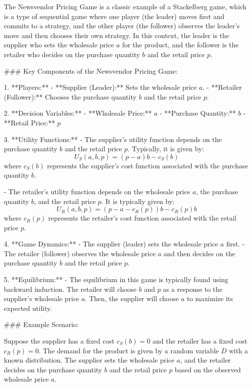 The Newsvendor Pricing Game is a classic example of a Stackelberg game, which is a type of sequential game where one player (the leader) moves first and commits to a strategy, and the other player (the follower) observes the leader's move and then chooses their own strategy. In this context, the leader is the supplier who sets the wholesale price \(a\) for the product, and the follower is the retailer who decides on the purchase quantity \(b\) and the retail price \(p\).

### Key Components of the Newsvendor Pricing Game:

1. **Players:**
   - **Supplier (Leader):** Sets the wholesale price \(a\).
   - **Retailer (Follower):** Chooses the purchase quantity \(b\) and the retail price \(p\).

2. **Decision Variables:**
   - **Wholesale Price:** \(a\)
   - **Purchase Quantity:** \(b\)
   - **Retail Price:** \(p\)

3. **Utility Functions:**
   - The supplier's utility function depends on the purchase quantity \(b\) and the retail price \(p\). Typically, it is given by:
     \[
     U_S(a, b, p) = (p - a)b - c_S(b)
     \]
     where \(c_S(b)\) represents the supplier's cost function associated with the purchase quantity \(b\).

   - The retailer's utility function depends on the wholesale price \(a\), the purchase quantity \(b\), and the retail price \(p\). It is typically given by:
     \[
     U_R(a, b, p) = (p - a - c_R(p))b - c_R(p)b
     \]
     where \(c_R(p)\) represents the retailer's cost function associated with the retail price \(p\).

4. **Game Dynamics:**
   - The supplier (leader) sets the wholesale price \(a\) first.
   - The retailer (follower) observes the wholesale price \(a\) and then decides on the purchase quantity \(b\) and the retail price \(p\).

5. **Equilibrium:**
   - The equilibrium in this game is typically found using backward induction. The retailer will choose \(b\) and \(p\) as a response to the supplier's wholesale price \(a\). Then, the supplier will choose \(a\) to maximize its expected utility.

### Example Scenario:

Suppose the supplier has a fixed cost \(c_S(b) = 0\) and the retailer has a fixed cost \(c_R(p) = 0\). The demand for the product is given by a random variable \(D\) with a known distribution. The supplier sets the wholesale price \(a\), and the retailer decides on the purchase quantity \(b\) and the retail price \(p\) based on the observed wholesale price \(a\).

